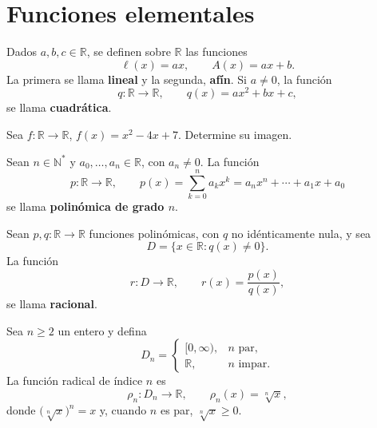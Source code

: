 \documentclass[10pt,a5paper]{article}
\newif\ifmostrarSoluciones
\begin{document}
\section*{Funciones elementales}

\begin{definicion}
Dados $a,b,c\in\mathbb{R}$, se definen sobre $\mathbb{R}$ las funciones
\[
\ell(x)=ax,\qquad A(x)=ax+b.
\]
La primera se llama \textbf{lineal} y la segunda, \textbf{afín}. Si $a\neq0$, la función
\[
q:\mathbb{R}\to\mathbb{R},\qquad q(x)=ax^2+bx+c,
\]
se llama \textbf{cuadrática}.
\end{definicion}

\begin{ejemplo}
Sea $f:\mathbb{R}\to\mathbb{R}$, $f(x)=x^2-4x+7$. Determine su imagen.
\end{ejemplo}
\ifmostrarSoluciones
\begin{solucion}
Al completar el cuadrado,
\[
f(x)=(x-2)^2+3\geq3.
\]
El mínimo $3$ se alcanza en $x=2$; por tanto, $\operatorname{Im}(f)=[3,\infty)$.
\end{solucion}
\else\vspace{15mm}\fi

\begin{definicion}
Sean $n\in\mathbb{N}^{*}$ y $a_0,\ldots,a_n\in\mathbb{R}$, con $a_n\neq0$. La función
\[
p:\mathbb{R}\to\mathbb{R},\qquad
p(x)=\sum_{k=0}^{n}a_kx^k
=a_nx^n+\cdots+a_1x+a_0
\]
se llama \textbf{polinómica de grado $n$}.
\end{definicion}

\begin{definicion}
Sean $p,q:\mathbb{R}\to\mathbb{R}$ funciones polinómicas, con $q$ no idénticamente nula, y sea
\[
D=\{x\in\mathbb{R}:q(x)\neq0\}.
\]
La función
\[
r:D\to\mathbb{R},\qquad r(x)=\frac{p(x)}{q(x)},
\]
se llama \textbf{racional}.
\end{definicion}

\begin{definicion}
Sea $n\geq2$ un entero y defina
\[
D_n=
\begin{cases}
[0,\infty),& n\text{ par},\\
\mathbb{R},& n\text{ impar}.
\end{cases}
\]
La función radical de índice $n$ es
\[
\rho_n:D_n\to\mathbb{R},\qquad \rho_n(x)=\sqrt[n]{x},
\]
donde $\bigl(\sqrt[n]{x}\bigr)^n=x$ y, cuando $n$ es par, $\sqrt[n]{x}\geq0$.
\end{definicion}
\end{document}
